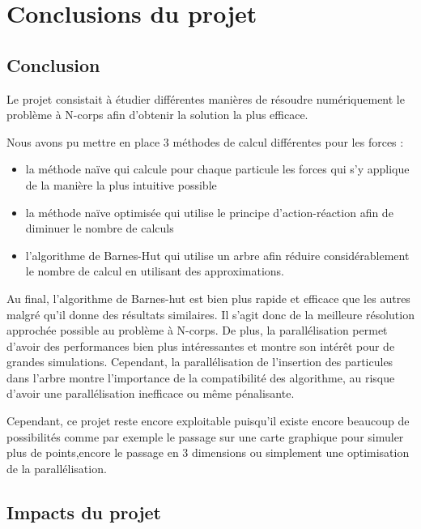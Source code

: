 \chapter{Conclusions du projet}

\section{Conclusion}

Le projet consistait à étudier différentes manières de résoudre numériquement le problème à N-corps afin d'obtenir la solution la plus efficace.

Nous avons pu mettre en place $3$ méthodes de calcul différentes pour les forces :

\begin{itemize}
\item la méthode naïve qui calcule pour chaque particule les forces qui s'y applique de la manière la plus intuitive possible

\item la méthode naïve optimisée qui utilise le principe d'action-réaction afin de diminuer le nombre de calculs

\item l'algorithme de Barnes-Hut qui utilise un arbre afin réduire considérablement le nombre de calcul en utilisant des approximations.

\end{itemize}


Au final, l'algorithme de Barnes-hut est bien plus rapide et efficace que les autres malgré qu'il donne des résultats similaires. Il s'agit donc de la meilleure résolution approchée possible au problème à N-corps. De plus, la parallélisation permet d'avoir des performances bien plus intéressantes et montre son intérêt pour de grandes simulations. Cependant, la parallélisation de l'insertion des particules dans l'arbre montre l'importance de la compatibilité des algorithme, au risque d'avoir une parallélisation inefficace ou même pénalisante.

Cependant, ce projet reste encore exploitable puisqu'il existe encore beaucoup de possibilités comme par exemple le passage sur une carte graphique pour simuler plus de points,encore le passage en 3 dimensions ou simplement une optimisation de la parallélisation.

\section{Impacts du projet}

